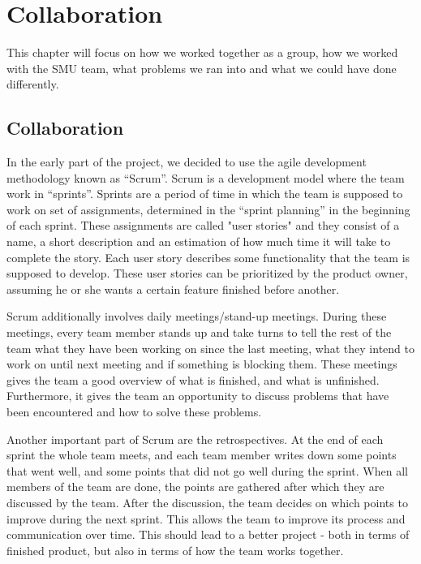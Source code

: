 \chapter{Collaboration}
This chapter will focus on how we worked together as a group, how we worked with the SMU team, what problems we ran into and what we could have done differently.

\section{Collaboration}
In the early part of the project, we decided to use the agile development methodology known as ``Scrum''. Scrum is a development model where the team work in ``sprints''. Sprints are a period of time in which the team is supposed to work on set of assignments, determined in the ``sprint planning'' in the beginning of each sprint. These assignments are called "user stories" and they consist of a name, a short description and an estimation of how much time it will take to complete the story. Each user story describes some functionality that the team is supposed to develop. These user stories can be prioritized by the product owner, assuming he or she wants a certain feature finished before another.

Scrum additionally involves daily meetings/stand-up meetings. During these meetings, every team member stands up and take turns to tell the rest of the team what they have been working on since the last meeting, what they intend to work on until next meeting and if something is blocking them. These meetings gives the team a good overview of what is finished, and what is unfinished. Furthermore, it gives the team an opportunity to discuss problems that have been encountered and how to solve these problems.

Another important part of Scrum are the retrospectives. At the end of each sprint the whole team meets, and each team member writes down some points that went well, and some points that did not go well during the sprint. When all members of the team are done, the points are gathered after which they are discussed by the team. After the discussion, the team decides on which points to improve during the next sprint. This allows the team to improve its process and communication over time. This should lead to a better project - both in terms of finished product, but also in terms of how the team works together.

